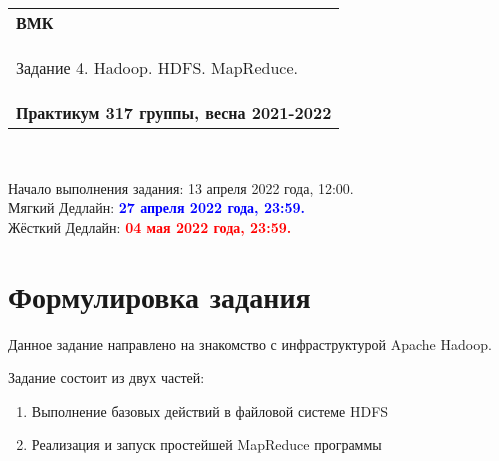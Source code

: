 \documentclass[10pt,fleqn]{article}
\begin{document}
\begin{center}
    \begin{tabular}{|p{17.5cm}|}
        \hline
        \textbf{ВМК}\\
        \begin{center} \Large Задание 4. Hadoop. HDFS. MapReduce. \end{center}\\
        \textbf{Практикум 317 группы, весна 2021-2022}\\
        \hline
    \end{tabular}
\end{center}

\

\begin{tabbing}
    Начало выполнения задания: 13 апреля 2022 года, 12:00.\\
    Мягкий Дедлайн: \textcolor{blue}{\bf 27 апреля 2022 года, 23:59.} \\
    Жёсткий Дедлайн: \textcolor{red}{\bf 04 мая 2022 года, 23:59.}
\end{tabbing}


\section*{Формулировка задания}
Данное задание направлено на знакомство с инфраструктурой Apache Hadoop.


Задание состоит из двух частей:
\begin{enumerate}
 \item Выполнение базовых действий в файловой системе HDFS
 \item Реализация и запуск простейшей MapReduce программы
\end{enumerate}
\end{document}
